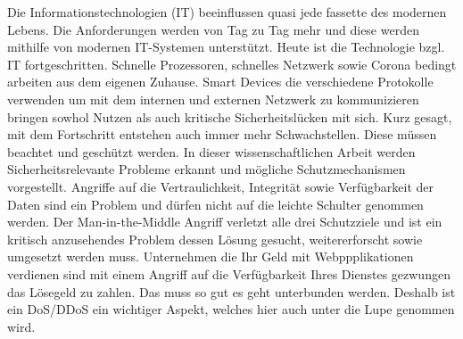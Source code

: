 Die Informationstechnologien (IT) beeinflussen quasi jede fassette des modernen Lebens. Die Anforderungen werden von Tag zu Tag mehr und diese werden mithilfe von modernen IT-Systemen unterstützt. Heute ist die Technologie bzgl. IT fortgeschritten. Schnelle Prozessoren, schnelles Netzwerk sowie Corona bedingt arbeiten aus dem eigenen Zuhause. Smart Devices die verschiedene Protokolle verwenden um mit dem internen und externen Netzwerk zu kommunizieren bringen sowhol Nutzen als auch kritische Sicherheitslücken mit sich. Kurz gesagt, mit dem Fortschritt entstehen auch immer mehr Schwachstellen. Diese müssen beachtet und geschützt werden. In dieser wissenschaftlichen Arbeit werden Sicherheitsrelevante Probleme erkannt und mögliche Schutzmechanismen vorgestellt. Angriffe auf die Vertraulichkeit, Integrität sowie Verfügbarkeit der Daten sind ein Problem und dürfen nicht auf die leichte Schulter genommen werden. Der Man-in-the-Middle Angriff verletzt alle drei Schutzziele und ist ein kritisch anzusehendes Problem dessen Lösung gesucht, weitererforscht sowie umgesetzt werden muss. Unternehmen die Ihr Geld mit Webppplikationen verdienen sind mit einem Angriff auf die Verfügbarkeit Ihres Dienstes gezwungen das Lösegeld zu zahlen. Das muss so gut es geht unterbunden werden. Deshalb ist ein DoS/DDoS ein wichtiger Aspekt, welches hier auch unter die Lupe genommen wird.  

\clearpage